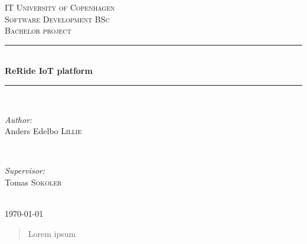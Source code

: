 \documentclass{article}
\begin{document}
\begin{titlepage}
	
	\newcommand{\HRule}{\rule{\linewidth}{0.5mm}} %
	
	\center %
	
	\textsc{\LARGE IT University of Copenhagen}\\[1.5cm] %
	\textsc{\Large Software Development BSc}\\[0.5cm] %
	\textsc{\large Bachelor project}\\[0.5cm] %
	
	\HRule \\[0.4cm]
	{ \huge \bfseries ReRide IoT platform}\\[0.4cm] %
	\HRule \\[1.5cm]

	\begin{minipage}{0.4\textwidth}
		\begin{flushleft} \large
			\emph{Author:}\\
			Anders Edelbo \textsc{Lillie} %
		\end{flushleft}
	\end{minipage}
	~
	\begin{minipage}{0.4\textwidth}
		\begin{flushright} \large
			\emph{Supervisor:} \\
			Tomas \textsc{Sokoler} %
		\end{flushright}
	\end{minipage}\\[4cm]
	
	{\large \today}\\[3cm] 
	
	\vfill %
	
\end{titlepage}

\begin{abstract}
	Lorem ipsum
\end{abstract}
\clearpage

\tableofcontents
\clearpage
{} %











\end{document}
